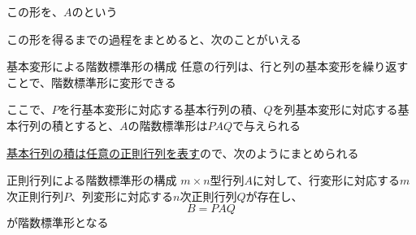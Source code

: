 \documentclass[../../../topic_linear-algebra]{subfiles}
\begin{document}
\br

この形を、$A$のという

この形を得るまでの過程をまとめると、次のことがいえる

\begin{theorem}{基本変形による階数標準形の構成}
  任意の行列は、行と列の基本変形を繰り返すことで、階数標準形に変形できる
\end{theorem}

\br

ここで、$P$を行基本変形に対応する基本行列の積、$Q$を列基本変形に対応する基本行列の積とすると、$A$の階数標準形は$PAQ$で与えられる

\br

\hyperref[thm:invertible-as-product-of-elementary]{基本行列の積は任意の正則行列を表す}ので、次のようにまとめられる

\begin{theorem}{正則行列による階数標準形の構成}\label{thm:rank-normal-form-by-regular-matrices}
  $m \times n$型行列$A$に対して、行変形に対応する$m$次正則行列$P$、列変形に対応する$n$次正則行列$Q$が存在し、
  \begin{equation*}
    B = PAQ
  \end{equation*}
  が階数標準形となる
\end{theorem}
\end{document}
